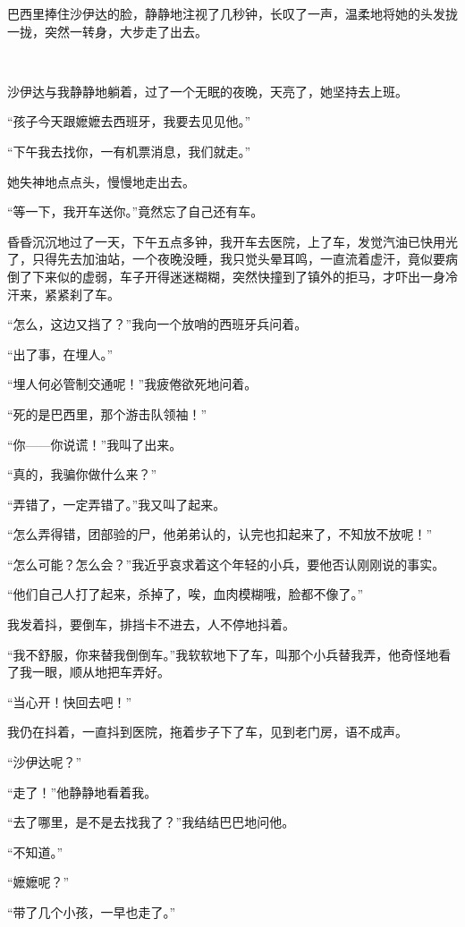 \par 巴西里捧住沙伊达的脸，静静地注视了几秒钟，长叹了一声，温柔地将她的头发拢一拢，突然一转身，大步走了出去。
\par  
\par 沙伊达与我静静地躺着，过了一个无眠的夜晚，天亮了，她坚持去上班。
\par “孩子今天跟嬷嬷去西班牙，我要去见见他。”
\par “下午我去找你，一有机票消息，我们就走。”
\par 她失神地点点头，慢慢地走出去。
\par “等一下，我开车送你。”竟然忘了自己还有车。
\par 昏昏沉沉地过了一天，下午五点多钟，我开车去医院，上了车，发觉汽油已快用光了，只得先去加油站，一个夜晚没睡，我只觉头晕耳鸣，一直流着虚汗，竟似要病倒了下来似的虚弱，车子开得迷迷糊糊，突然快撞到了镇外的拒马，才吓出一身冷汗来，紧紧刹了车。
\par “怎么，这边又挡了？”我向一个放哨的西班牙兵问着。
\par “出了事，在埋人。”
\par “埋人何必管制交通呢！”我疲倦欲死地问着。
\par “死的是巴西里，那个游击队领袖！”
\par “你——你说谎！”我叫了出来。
\par “真的，我骗你做什么来？”
\par “弄错了，一定弄错了。”我又叫了起来。
\par “怎么弄得错，团部验的尸，他弟弟认的，认完也扣起来了，不知放不放呢！”
\par “怎么可能？怎么会？”我近乎哀求着这个年轻的小兵，要他否认刚刚说的事实。
\par “他们自己人打了起来，杀掉了，唉，血肉模糊哦，脸都不像了。”
\par 我发着抖，要倒车，排挡卡不进去，人不停地抖着。
\par “我不舒服，你来替我倒倒车。”我软软地下了车，叫那个小兵替我弄，他奇怪地看了我一眼，顺从地把车弄好。
\par “当心开！快回去吧！”
\par 我仍在抖着，一直抖到医院，拖着步子下了车，见到老门房，语不成声。
\par “沙伊达呢？”
\par “走了！”他静静地看着我。
\par “去了哪里，是不是去找我了？”我结结巴巴地问他。
\par “不知道。”
\par “嬷嬷呢？”
\par “带了几个小孩，一早也走了。”
